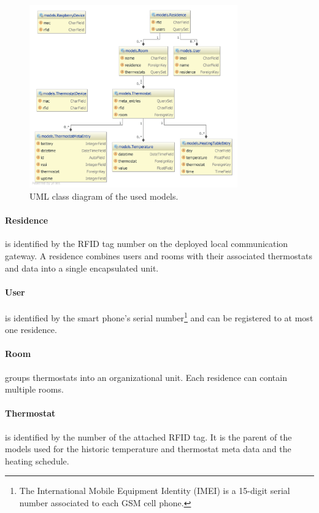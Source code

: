 \begin{figure}[h]
\begin{center}
\includegraphics[width=0.8\textwidth]{images/uml_class_diagram_pycharm_highres.png}
\end{center}
\caption{UML class diagram of the used models.
	}
\label{fig:class_diagram}
\end{figure}

\paragraph{Residence} is identified by the RFID tag number on the deployed local communication gateway.
A residence combines users and rooms with their associated thermostats and data into a single encapsulated unit.

\paragraph{User} is identified by the smart phone's serial number\footnote{The International Mobile Equipment Identity (IMEI) is a 15-digit serial number associated to each GSM cell phone.} and can be registered to at most one residence.

\paragraph{Room} groups thermostats into an organizational unit.
Each residence can contain multiple rooms.

\paragraph{Thermostat} is identified by the number of the attached RFID tag.
It is the parent of the models used for the historic temperature and thermostat meta data and the heating schedule.

